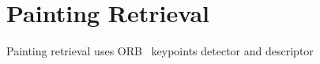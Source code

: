 \section{Painting Retrieval}
Painting retrieval uses ORB~\cite{orb} keypoints detector and descriptor 